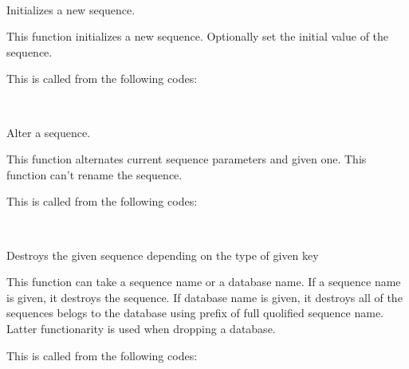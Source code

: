     \FuncRefHdr
		\\ \hline
    \FuncRefTrailor
  
  
    Initializes a new sequence.
    
    This function initializes a new sequence.
    Optionally set the initial value of the sequence.
    
    This is called from the following codes:
    
    \FuncRefHdr
		\\ \hline
    \FuncRefTrailor
  
  
    Alter a sequence.
    
    This function alternates current sequence parameters and given one.
    This function can't rename the sequence.
    
    This is called from the following codes:
    
    \FuncRefHdr
		\\ \hline
    \FuncRefTrailor
  
  
    Destroys the given sequence depending on the type of given key
    
    This function can take a sequence name or a database name.
    If a sequence name is given, it destroys the sequence.
    If database name is given, it destroys all of the sequences belogs to the database using prefix of full quolified sequence name.
    Latter functionarity is used when dropping a database.
    
    This is called from the following codes:
    
    \FuncRefHdr
		\\
		\\ \hline
    \FuncRefTrailor
  
